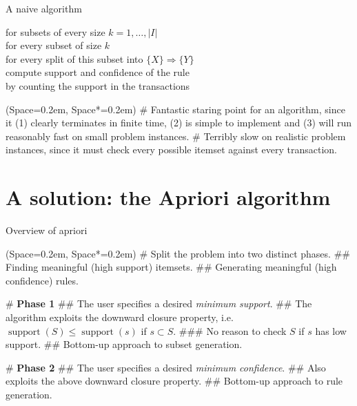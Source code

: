 \documentclass[12pt, aspectratio=1610]{beamer}
\newcommand{\listSpace}{0.2em}
\theoremstyle{plain}
\begin{document}
\begin{frame}[fragile]{A naive algorithm}
	
	\begin{example}
		for subsets of every size $k=1, \dots, |I|$ \\
		\hspace*{1em} for every subset of size $k$ \\
		\hspace*{2em} for every split of this subset into $\{ X \} \Rightarrow \{ Y \}$ \\
		\hspace*{3em} compute support and confidence of the rule \\
		\hspace*{3em} by counting the support in the transactions
	\end{example}
	
	\begin{easylist}[itemize]
		\ListProperties(Space=\listSpace, Space*=\listSpace)
		# Fantastic staring point for an algorithm, since it (1) clearly terminates in finite time, (2) is simple to implement and (3) will run reasonably fast on small problem instances.
		# Terribly slow on realistic problem instances, since it must check every possible itemset against every transaction.
	\end{easylist}
\end{frame}
\section{A solution: the Apriori algorithm}
\begin{frame}[fragile]{Overview of apriori}
	
	\begin{easylist}[itemize]
		\ListProperties(Space=\listSpace, Space*=\listSpace)
		# Split the problem into two distinct phases.
		## Finding meaningful (high support) itemsets.
		## Generating meaningful (high confidence) rules.
		
		# \textbf{Phase 1}
		## The user specifies a desired \emph{minimum support}.
		## The algorithm exploits the downward closure property, i.e. $\operatorname{support}(S) \leq \operatorname{support}(s)$ if $s \subset S$.
		### No reason to check $S$ if $s$ has low support.
		## Bottom-up approach to subset generation.
		
		# \textbf{Phase 2}
		## The user specifies a desired \emph{minimum confidence}.
		## Also exploits the above downward closure property.
		## Bottom-up approach to rule generation.
	\end{easylist}
\end{frame}
\end{document}
